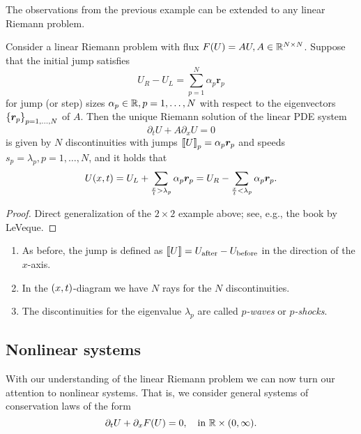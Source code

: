 The observations from the previous example can be extended to any linear Riemann problem.

\begin{theorem}\label{thm:10-7}
	Consider a linear Riemann problem with flux \(F\parentheses*{U} = AU, A \in \R^{N \times N}\).
	Suppose that the initial jump satisfies
	\[
		U_R - U_L = \sum_{p = 1}^N \alpha_p \bm{r}_p
	\]
	for jump (or step) sizes \(\alpha_p \in \R, p = 1, \ldots, N\) with respect to the eigenvectors \(\braces*{\bm{r}_p}_{p = 1, \ldots, N}\) of \(A\).
	Then the unique Riemann solution of the linear PDE system
	\[
		\partial_t U + A\partial_x U = 0
	\]
	is given by \(N\) discontinuities with jumps \(\Brackets*{U}_p = \alpha_p \bm{r}_p\) and speeds \(s_p = \lambda_p, p = 1, \ldots, N\), and it holds that
	\[
		U\parentheses*{x, t} = U_L + \sum_{\frac{x}{t} > \lambda_p}\alpha_p \bm{r}_p = U_R - \sum_{\frac{x}{t} < \lambda_p}\alpha_p \bm{r}_p.
	\]
\end{theorem}

\begin{proof}
	Direct generalization of the \(2 \times 2\) example above; see, e.g., the book by LeVeque.
\end{proof}

\begin{remark}
	\begin{enumerate}
		\item As before, the jump is defined as \(\Brackets*{U} = U_{\text{after}} - U_{\text{before}}\) in the direction of the \(x\)-axis.
		\item In the \(\parentheses*{x, t}\)-diagram we have \(N\) rays for the \(N\) discontinuities.
		\item The discontinuities for the eigenvalue \(\lambda_p\) are called \emph{\(p\)-waves} or \emph{\(p\)-shocks}.
	\end{enumerate}
\end{remark}


\subsection{Nonlinear systems}

With our understanding of the linear Riemann problem we can now turn our attention to nonlinear systems.
That is, we consider general systems of conservation laws of the form
\[
	\partial_t U + \partial_x F\parentheses*{U} = 0, \quad \text{in }\R \times \parentheses*{0, \infty}.
\]

